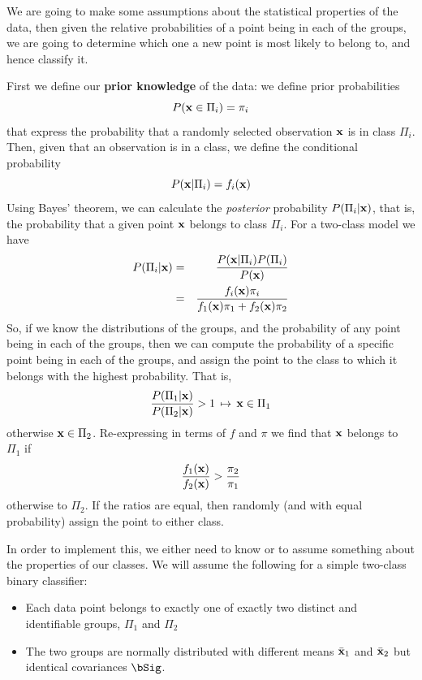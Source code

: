\documentclass[12pt,a4paper]{tufte-handout}
\begin{document}
We are going to make some assumptions about the statistical properties of the data, then given the relative probabilities of a point being in each of the groups, we are going to determine which one a new point is most likely to belong to, and hence classify it.

First we define our \textbf{prior knowledge} of the data: we define prior probabilities
\begin{equation}
  P(\mathbf{x}\in\Pi_i) = \pi_i
\end{equation}
that express the probability that a randomly selected observation $\mathbf{x}$ is in class $\Pi_i$. Then, given that an observation is in a class, we define the conditional probability
\begin{equation}
  P(\mathbf{x}|\Pi_i)=f_i(\mathbf{x})
\end{equation}
Using Bayes' theorem, we can calculate the \textit{posterior} probability $P(\Pi_i|\mathbf{x})$, that is, the probability that a given point $\mathbf{x}$ belongs to class $\Pi_i$. For a two-class model we have
\begin{eqnarray}
  P(\Pi_i|\mathbf{x})  &=& \frac{P(\mathbf{x}|\Pi_i)P(\Pi_i)}{P(\mathbf{x})}\\
&=& \frac{f_i(\mathbf{x})\pi_i}{f_1(\mathbf{x})\pi_1+f_2(\mathbf{x})\pi_2}
\end{eqnarray}
So, if we know the distributions of the groups, and the probability of any point being in each of the groups, then we can compute the probability of a specific point being in each of the groups, and assign the point to the class to which it belongs with the highest probability. That is,
\begin{equation}
  \frac{P(\Pi_1|\mathbf{x})}{P(\Pi_2|\mathbf{x})}>1 \,\mapsto\, \mathbf{x}\in\Pi_1
\end{equation}
otherwise $\mathbf{x}\in\Pi_2$. Re-expressing in terms of $f$ and $\pi$ we find that $\mathbf{x}$ belongs to $\Pi_1$ if
\begin{equation}
  \frac{f_1(\mathbf{x})}{f_2(\mathbf{x})}>\frac{\pi_2}{\pi_1}\label{eq:classratio}
\end{equation}
otherwise to $\Pi_2$. If the ratios are equal, then randomly (and with equal probability) assign the point to either class.

In order to implement this, we either need to know or to assume something about the properties of our classes. We will assume the following for a simple two-class binary classifier:

\begin{itemize}
  \item Each data point belongs to exactly one of exactly two distinct and identifiable groups, $\Pi_1$ and $\Pi_2$
  \item The two groups are normally distributed with different means $\bar{\mathbf{x}}_1$ and $\bar{\mathbf{x}}_2$ but identical covariances $\bSig$.
\end{itemize}
\end{document}
